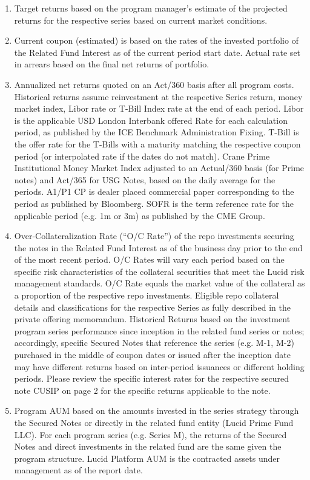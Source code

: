 \documentclass[9pt]{article}
\begin{document}
\begin{enumerate}
\item Target returns based on the program manager's estimate of the projected returns for the respective series based on current market conditions. 

\item Current coupon (estimated) is based on the rates of the invested portfolio of the Related Fund Interest as of the current period start date.  Actual rate set in arrears based on the final net returns of portfolio.  

\item Annualized net returns quoted on an Act/360 basis after all program costs. Historical returns assume reinvestment at the respective Series return, money market index, Libor rate or T-Bill Index rate at the end of each period.  Libor is the applicable USD London Interbank offered Rate for each calculation period, as published by the ICE Benchmark Administration Fixing. T-Bill is the offer rate for the T-Bills with a maturity matching the respective coupon period (or interpolated rate if the dates do not match). Crane Prime Institutional Money Market Index adjusted to an Actual/360 basis (for Prime notes) and Act/365 for USG Notes, based on the daily average for the periods. A1/P1 CP is dealer placed commercial paper corresponding to the period as published by Bloomberg. SOFR is the term reference rate for the applicable period (e.g. 1m or 3m) as published by the CME Group.

\item Over-Collateralization Rate (``O/C Rate'') of the repo investments securing the notes in the Related Fund Interest as of the business day prior to the end of the most recent period. O/C Rates will vary each period based on the specific risk characteristics of the collateral securities that meet the Lucid risk management standards. O/C Rate equals the market value of the collateral as a proportion of the respective repo investments. Eligible repo collateral details and classifications for the respective Series as fully described in the private offering memorandum. Historical Returns based on the investment program series performance since inception in the related fund series or notes; accordingly, specific Secured Notes that reference the series (e.g. M-1, M-2) purchased in the middle of coupon dates or issued after the inception date may have different returns based on inter-period issuances or different holding periods. Please review the specific interest rates for the respective secured note CUSIP on page 2 for the specific returns applicable to the note.

\item Program AUM based on the amounts invested in the series strategy through the Secured Notes or directly in the related fund entity (Lucid Prime Fund LLC).  For each program series (e.g. Series M), the returns of the Secured Notes and direct investments in the related fund are the same given the program structure. Lucid Platform AUM is the contracted assets under management as of the report date.

\end{enumerate}
\end{document}
